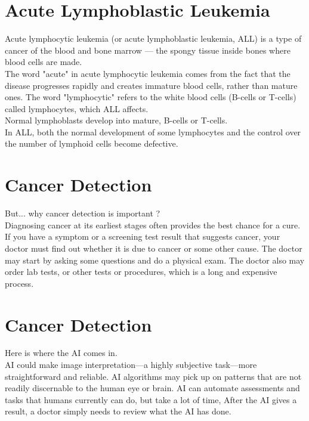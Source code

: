 \documentclass{SBCbookchapter}
\begin{document}
\section*{Acute Lymphoblastic Leukemia}
Acute lymphocytic leukemia (or acute lymphoblastic leukemia, ALL)
is a type of cancer of the blood and bone marrow — 
the spongy tissue inside bones where blood cells are made. \\
The word "acute" in acute lymphocytic leukemia comes
from the fact that the disease progresses rapidly and
creates immature blood cells, rather than mature ones.
The word "lymphocytic" 
refers to the white blood cells (B-cells or T-cells) called lymphocytes, 
which ALL affects. \\
Normal lymphoblasts develop into mature, B-cells or T-cells.\\
In ALL, both the normal development of some 
lymphocytes and the control over the number of 
lymphoid cells become defective.

\section*{Cancer Detection}
But... why cancer detection is important ? \\
Diagnosing cancer at its earliest stages often provides the
best chance for a cure. \\
If you have a symptom or a screening test result that suggests cancer,
your doctor must find out whether it is due to cancer or some other
cause.
The doctor may start by asking some questions and do a physical exam. 
The doctor also may order lab tests, or other tests or procedures,
which is a long and expensive process.

\section*{Cancer Detection}
Here is where the AI comes in. \\
AI could make image interpretation—a highly subjective task—more
straightforward and reliable.
AI algorithms may pick up on patterns that are not readily
discernable to the human eye or brain.
AI can automate assessments and tasks that humans currently can
do, but take a lot of time, After the AI gives a result, a doctor simply
needs to review what the AI has done.
\end{document}
